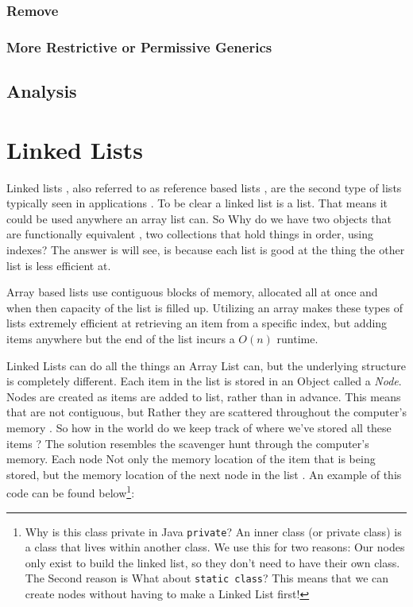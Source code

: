 \subsection{Remove}


\subsection{More Restrictive or Permissive Generics}

\section{Analysis}



\chapter{Linked Lists}
Linked lists , also referred to as reference based lists , are the second type of lists typically seen in applications . To be clear a linked list is a list. That means it could be used anywhere an array list can.   So Why do we have two objects that are functionally equivalent , two collections that hold things in order, using indexes?  The answer is will see, is because each list is good at the thing the other list is less efficient at.


Array based lists use contiguous blocks of memory, allocated all at once and when then capacity of the list is filled up.  Utilizing an array makes these types of lists extremely efficient at retrieving an item from a specific index, but adding items anywhere but the end of the list incurs a $O(n)$ runtime.



Linked Lists can do all the things an Array List can, but the underlying structure is completely different.  
Each item in the list is stored in an Object called a \textit{Node}.  Nodes are created as items are added to list, rather than in advance.  This means that are not contiguous, but Rather they are scattered throughout the computer's memory . So how in the world do we keep track of where we've stored all these items ? The solution resembles the scavenger hunt through the computer's memory.  Each node Not only the memory location of the item that is being stored, but the memory location of the next node in the list . An example of this code can be found below\footnote{Why is this class private in Java \texttt{private}? An inner class  (or private class) is a class that lives within another class.  We use this for two reasons:  Our nodes only exist to build the linked list, so they don't need to have their own class.  The Second reason is   What about \texttt{static class}? This means that we can create nodes without having to make a Linked List first! }: %

